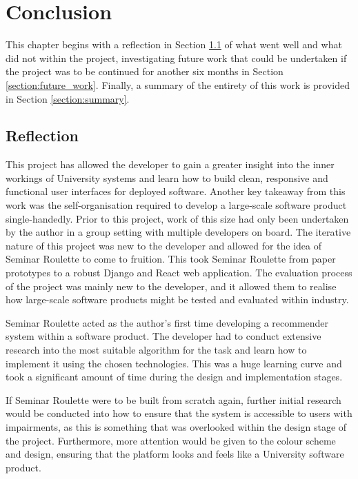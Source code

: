 \documentclass{l4proj}
\begin{document}
\chapter{Conclusion}    
\label{chapter:conclusion}

This chapter begins with a reflection in Section \ref{section:reflection} of what went well and what did not within the project, investigating future work that could be undertaken if the project was to be continued for another six months in Section \ref{section:future_work}. Finally, a summary of the entirety of this work is provided in Section \ref{section:summary}.

\section{Reflection}
\label{section:reflection}

This project has allowed the developer to gain a greater insight into the inner workings of University systems and learn how to build clean, responsive and functional user interfaces for deployed software. Another key takeaway from this work was the self-organisation required to develop a large-scale software product single-handedly. Prior to this project, work of this size had only been undertaken by the author in a group setting with multiple developers on board. The iterative nature of this project was new to the developer and allowed for the idea of Seminar Roulette to come to fruition. This took Seminar Roulette from paper prototypes to a robust Django and React web application. The evaluation process of the project was mainly new to the developer, and it allowed them to realise how large-scale software products might be tested and evaluated within industry.

Seminar Roulette acted as the author's first time developing a recommender system within a software product. The developer had to conduct extensive research into the most suitable algorithm for the task and learn how to implement it using the chosen technologies. This was a huge learning curve and took a significant amount of time during the design and implementation stages.

If Seminar Roulette were to be built from scratch again, further initial research would be conducted into how to ensure that the system is accessible to users with impairments, as this is something that was overlooked within the design stage of the project. Furthermore, more attention would be given to the colour scheme and design, ensuring that the platform looks and feels like a University software product.
\end{document}
